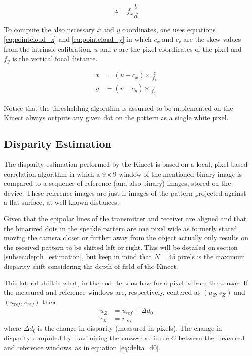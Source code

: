 \documentclass[journal]{IEEEtran}
\begin{document}
\begin{equation}
    z = f_x \frac{b}{d}
    \label{eq:stereo-triangulation}
\end{equation}

To compute the also necessary $x$ and $y$ coordinates, one uses equations \ref{eq:pointcloud_x} and \ref{eq:pointcloud_y} in which $c_x$ and $c_y$ are the skew values from the intrinsic calibration, $u$ and $v$ are the pixel coordinates of the pixel and $f_y$ is the vertical focal distance.

\begin{align} 
x &= (u - c_x) \times \frac{z}{f_x} \label{eq:pointcloud_x} \\ 
y &= (v - c_y) \times \frac{z}{f_y} \label{eq:pointcloud_y}
\end{align}

Notice that the thresholding algorithm is assumed to be implemented on the Kinect always outputs any given dot on the pattern as a single white pixel.

\subsection{Disparity Estimation}

The disparity estimation performed by the Kinect is based on a local, pixel-based correlation algorithm in which a $9\times9$ window of the mentioned binary image is compared to a sequence of reference (and also binary) images, stored on the device. These reference images are just \gls{ir} images of the pattern projected against a flat surface, at well known distances.

Given that the epipolar lines of the transmitter and receiver are aligned and that the binarized dots in the speckle pattern are one pixel wide as formerly stated, moving the camera closer or further away from the object actually only results on the received pattern to be shifted left or right. This will be detailed on section \ref{subsec:depth_estimation}, but keep in mind that $N = 45$ pixels is the maximum disparity shift considering the depth of field of the Kinect.

This lateral shift is what, in the end, tells us how far a pixel is from the sensor. If the measured and reference windows are, respectively, centered at $(u_Z, v_Z)$ and $(u_{ref}, v_{ref})$ then 
%
\begin{align*}
    u_Z &= u_{ref} + \Delta d_0 \\
    v_Z &= v_{ref}
\end{align*}
%
where $\Delta d_0$ is the change in disparity (measured in pixels). The change in disparity computed by maximizing the cross-covariance $C$ between the measured and reference windows, as in equation \ref{eq:delta_d0}.
\end{document}
